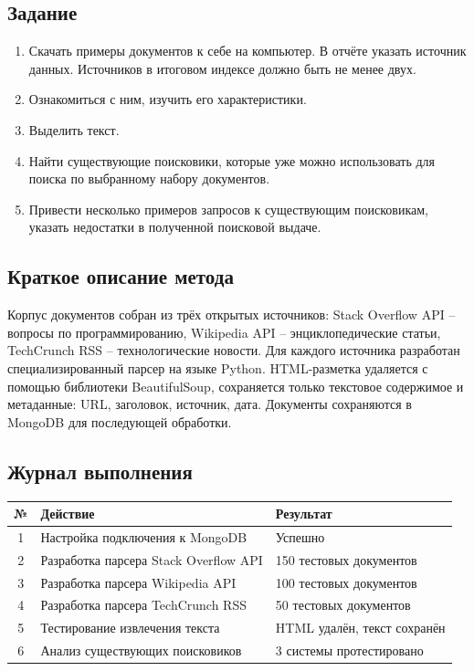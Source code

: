 \documentclass[a4paper, 12pt]{article}
\begin{document}
\subsection*{Задание}
\begin{enumerate}
    \item Скачать примеры документов к себе на компьютер. В отчёте указать источник данных. Источников в итоговом индексе должно быть не менее двух.
    \item Ознакомиться с ним, изучить его характеристики.
    \item Выделить текст.
    \item Найти существующие поисковики, которые уже можно использовать для поиска по выбранному набору документов.
    \item Привести несколько примеров запросов к существующим поисковикам, указать недостатки в полученной поисковой выдаче.
\end{enumerate}

\subsection*{Краткое описание метода}
Корпус документов собран из трёх открытых источников: Stack Overflow API – вопросы по программированию, Wikipedia API – энциклопедические статьи, TechCrunch RSS – технологические новости. Для каждого источника разработан специализированный парсер на языке Python. HTML-разметка удаляется с помощью библиотеки BeautifulSoup, сохраняется только текстовое содержимое и метаданные: URL, заголовок, источник, дата. Документы сохраняются в MongoDB для последующей обработки.

\subsection*{Журнал выполнения}
\begin{table}[h]
\centering
\begin{tabular}{|c|l|l|}
\hline
\textbf{№} & \textbf{Действие} & \textbf{Результат} \\ \hline
1 & Настройка подключения к MongoDB & Успешно \\ \hline
2 & Разработка парсера Stack Overflow API & 150 тестовых документов \\ \hline
3 & Разработка парсера Wikipedia API & 100 тестовых документов \\ \hline
4 & Разработка парсера TechCrunch RSS & 50 тестовых документов \\ \hline
5 & Тестирование извлечения текста & HTML удалён, текст сохранён \\ \hline
6 & Анализ существующих поисковиков & 3 системы протестировано \\ \hline
\end{tabular}
\end{table}
\end{document}
